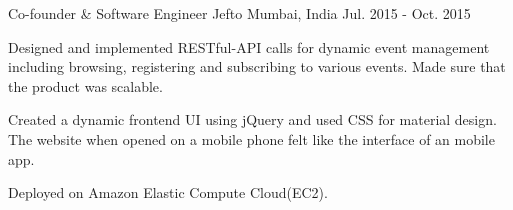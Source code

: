 

\begin{cventries}
  
  \cventry
    {Co-founder \& Software Engineer} %
    {Jefto} %
    {Mumbai, India} %
    {Jul. 2015 - Oct. 2015} %
    {
      \begin{cvitems} %
        \item {Designed and implemented RESTful-API calls for dynamic event management including browsing, registering and subscribing to various events. Made sure that the product was scalable. }
        \item {Created a dynamic frontend UI using jQuery and used CSS for material design. The website when opened on a mobile phone felt like the interface of an mobile app.}
        \item {Deployed on Amazon Elastic Compute Cloud(EC2). }
      \end{cvitems}
    }

\end{cventries}




